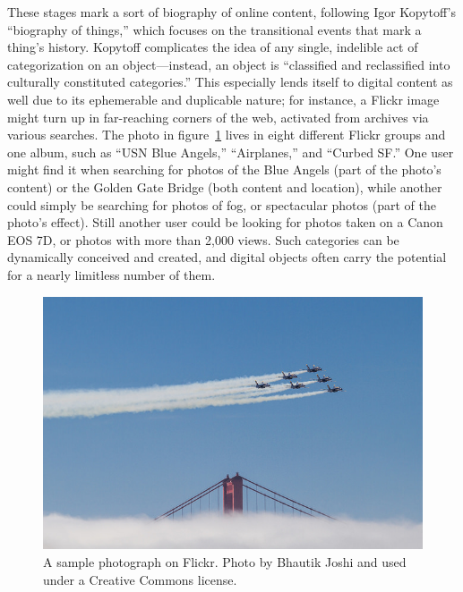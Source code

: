 These stages mark a sort of biography of online content, following Igor Kopytoff's ``biography of things,'' which focuses on the transitional events that mark a thing's history.  Kopytoff complicates the idea of any single, indelible act of categorization on an object---instead, an object is ``classified and reclassified into culturally constituted categories.''\autocite[68]{appadurai_cultural_1986} This especially lends itself to digital content as well due to its ephemerable and duplicable nature; for instance, a Flickr image might turn up in far-reaching corners of the web, activated from archives via various searches. The photo in figure~\ref{fig:fleetweek} lives in eight different Flickr groups and one album, such as ``USN Blue Angels,'' ``Airplanes,'' and ``Curbed SF.''\autocite{joshi_fleet_2014} One user might find it when searching for photos of the Blue Angels (part of the photo's content) or the Golden Gate Bridge (both content and location), while another could simply be searching for photos of fog, or spectacular photos (part of the photo's effect). Still another user could be looking for photos taken on a Canon EOS 7D, or photos with more than 2,000 views. Such categories can be dynamically conceived and created, and digital objects often carry the potential for a nearly limitless number of them.

\begin{figure}[ht]
\centering
\includegraphics[width=375pt]{figures/fleetweek}
\caption{A sample photograph on Flickr. Photo by Bhautik Joshi and used under a Creative Commons license.}
\label{fig:fleetweek}
\end{figure}

